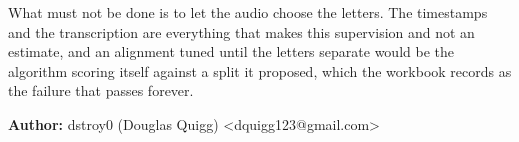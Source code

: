 What must not be done is to let the audio choose the letters. The timestamps and the transcription are
everything that makes this supervision and not an estimate, and an alignment tuned until the
letters separate would be the algorithm scoring itself against a split it proposed, which the workbook
records as the failure that passes forever.

\textbf{Author:} dstroy0 (Douglas Quigg) <dquigg123@gmail.com>
